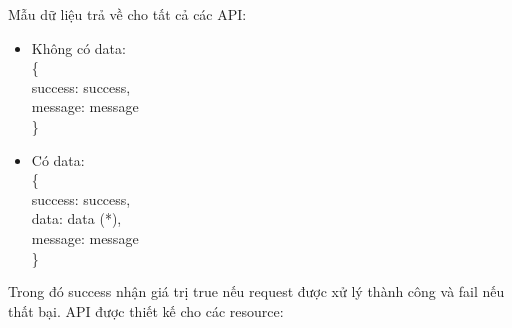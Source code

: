 \documentclass[a4paper,12pt,oneside]{article}
\begin{document}
\noindent Mẫu dữ liệu trả về cho tất cả các API:
\begin{itemize}
\item Không có data:\\
\{\\
\indent success: success,\\
\indent message: message\\
\}
\item Có data:\\
\{\\
\indent success: success,\\
\indent data: data (*),\\
\indent message: message\\
\}

\end{itemize}
Trong đó success nhận giá trị true nếu request được xử lý thành công và fail nếu thất bại.
\noindent API được thiết kế cho các resource:
\end{document}

